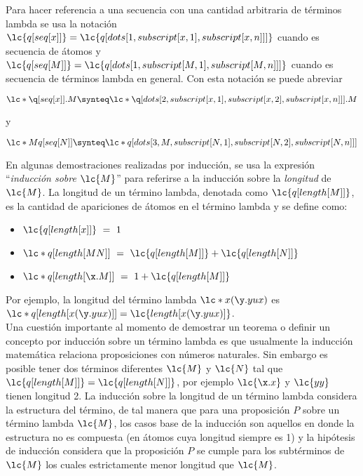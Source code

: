 Para hacer referencia a una secuencia con una cantidad arbitraria de términos
lambda se usa la notación
\(\lc{q[seq[x]]}=\lc{q[dots[1,subscript[x,1],subscript[x,n]]]}\) cuando es
secuencia de átomos y
\(\lc{q[seq[M]]}=\lc{q[dots[1,subscript[M,1],subscript[M,n]]]}\) cuando es
secuencia de términos lambda en general. Con esta notación se puede abreviar

\[\lc*{\q[seq[x]].M} \synteq 
\lc*{\q[dots[2,subscript[x,1],subscript[x,2],subscript[x,n]]].M}\]

y


\[\lc*{M q[seq[N]]} \synteq
  \lc*{q[dots[3,M,subscript[N,1],subscript[N,2],subscript[N,n]]]}\]

En algunas demostraciones realizadas por inducción, se usa la expresión
``\emph{inducción sobre} \(\lc{M}\)'' para referirse a la inducción sobre la
\emph{longitud} de \(\lc{M}\). La longitud de un término lambda, denotada como
\(\lc{q[length[M]]}\), es la cantidad de apariciones de átomos en el término
lambda y se define como:

\begin{itemize}
\item \(\lc{q[length[x]]}\ =\ 1\)
\item \(\lc*{q[length[M N]]}\ =\ \lc{q[length[M]]} + \lc{q[length[N]]}\)
\item \(\lc*{q[length[\x.M]]}\ =\ 1 + \lc{q[length[M]]}\)
\end{itemize}

Por ejemplo, la longitud del término lambda \(\lc*{x(\y.y u x)}\) es
\(\lc*{q[length[x(\y.y u x)]]}=\lc{length[x(\y.y u x)]}\). \\

Una cuestión importante al momento de demostrar un teorema o definir un concepto
por inducción sobre un término lambda es que usualmente la inducción matemática
relaciona proposiciones con números naturales. Sin embargo es posible tener dos
términos diferentes \(\lc{M}\) y \(\lc{N}\) tal que
\(\lc{q[length[M]]}=\lc{q[length[N]]}\), por ejemplo \(\lc{\x.x}\) y \(\lc{y
  y}\) tienen longitud 2. La inducción sobre la longitud de un término lambda
considera la estructura del término, de tal manera que para una proposición
\(P\) sobre un término lambda \(\lc{M}\), los casos base de la inducción son
aquellos en donde la estructura no es compuesta (en átomos cuya longitud siempre
es 1) y la hipótesis de inducción considera que la proposición \(P\) se cumple
para los subtérminos de \(\lc{M}\) los cuales estrictamente menor longitud que
\(\lc{M}\). \\

